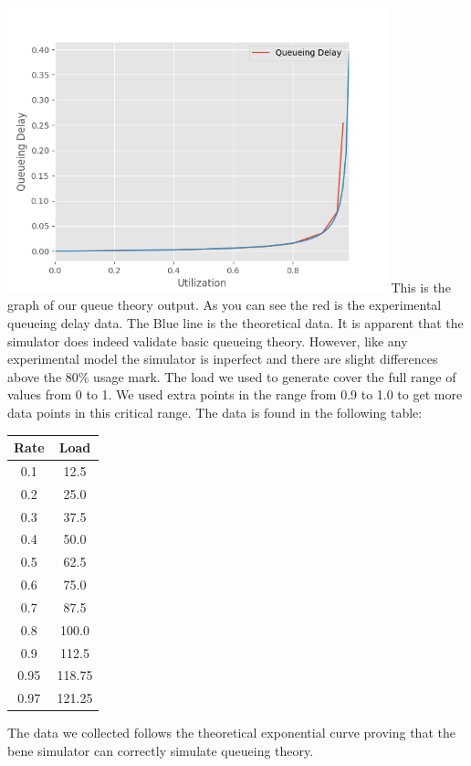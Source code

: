 \documentclass[fleqn,11pt]{article}
\begin{document}
\includegraphics[width=11cm]{graphs/line}
\newline
This is the graph of our queue theory output. As you can see the red is the experimental queueing delay data. The Blue line is the theoretical data. It is apparent that the simulator does indeed validate basic queueing theory. However, like any experimental model the simulator is inperfect and there are slight differences above the 80\% usage mark.
\newline
\newline
The load we used to generate cover the full range of values from 0 to 1. We used extra points in the range from 0.9 to 1.0 to get more data points in this critical range. The data is found in the following table:
\begin{center}
  \begin{tabular}{c c}
  \hline
  Rate & Load \\ [0.5ex]
  \hline\hline
  0.1 & 12.5 \\
  0.2 & 25.0 \\
  0.3 & 37.5 \\
  0.4 & 50.0 \\
  0.5 & 62.5 \\
  0.6 & 75.0 \\
  0.7 & 87.5 \\
  0.8 & 100.0 \\
  0.9 & 112.5 \\
  0.95 & 118.75 \\
  0.97 & 121.25 \\ [1ex]
  \end{tabular}
  \end{center}

The data we collected follows the theoretical exponential curve proving that the bene simulator can correctly simulate queueing theory. 
\end{document}
